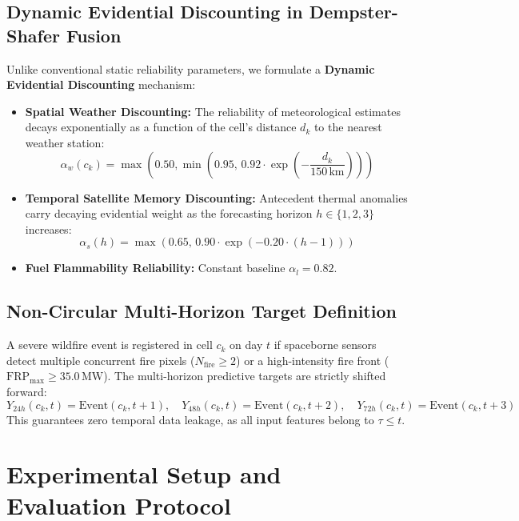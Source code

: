 \documentclass[runningheads]{llncs}
\begin{document}
\subsection{Dynamic Evidential Discounting in Dempster-Shafer Fusion}
Unlike conventional static reliability parameters, we formulate a \textbf{Dynamic Evidential Discounting} mechanism:
\begin{itemize}
    \item \textbf{Spatial Weather Discounting:} The reliability of meteorological estimates decays exponentially as a function of the cell's distance $d_k$ to the nearest weather station:
    \begin{equation}
        \alpha_w(c_k) = \max\left(0.50, \min\left(0.95, \, 0.92 \cdot \exp\left(-\frac{d_k}{150\,\text{km}}\right)\right)\right)
    \end{equation}
    \item \textbf{Temporal Satellite Memory Discounting:} Antecedent thermal anomalies carry decaying evidential weight as the forecasting horizon $h \in \{1, 2, 3\}$ increases:
    \begin{equation}
        \alpha_s(h) = \max\left(0.65, \, 0.90 \cdot \exp(-0.20 \cdot (h - 1))\right)
    \end{equation}
    \item \textbf{Fuel Flammability Reliability:} Constant baseline $\alpha_l = 0.82$.
\end{itemize}

\subsection{Non-Circular Multi-Horizon Target Definition}
A severe wildfire event is registered in cell $c_k$ on day $t$ if spaceborne sensors detect multiple concurrent fire pixels ($N_{\text{fire}} \ge 2$) or a high-intensity fire front ($\text{FRP}_{\max} \ge 35.0\,\text{MW}$). The multi-horizon predictive targets are strictly shifted forward:
\begin{equation}
    Y_{24h}(c_k, t) = \text{Event}(c_k, t+1), \quad Y_{48h}(c_k, t) = \text{Event}(c_k, t+2), \quad Y_{72h}(c_k, t) = \text{Event}(c_k, t+3)
\end{equation}
This guarantees zero temporal data leakage, as all input features belong to $\tau \le t$.

\section{Experimental Setup and Evaluation Protocol}
\label{sec:experiments}
\end{document}
